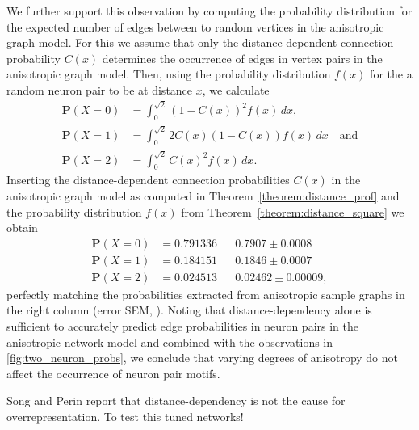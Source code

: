 We further support this observation by computing the probability
distribution for the expected number of edges between to random
vertices in the anisotropic graph model. For this we assume that only
the distance-dependent connection probability $C(x)$ determines the
occurrence of edges in vertex pairs in the anisotropic graph
model. Then, using the probability distribution $f(x)$ for the a
random neuron pair to be at distance $x$, we calculate
\begin{align*}
\mathbf{P}(X=0) & = \int_0^{\sqrt{2}} (1-C(x))^2 f(x)\,
dx, \\
\mathbf{P}(X=1) & = \int_0^{\sqrt{2}} 2 C(x) (1-C(x)) f(x) \, dx \quad \mathrm{and}\\
\mathbf{P}(X=2) & = \int_0^{\sqrt{2}} C(x)^2 f(x) \, dx. 
\end{align*}
Inserting the distance-dependent connection probabilities $C(x)$ in
the anisotropic graph model as computed in
Theorem~\ref{theorem:distance_prof} and the probability distribution
$f(x)$ from Theorem~\ref{theorem:distance_square} we obtain
\begin{align*} 
\mathbf{P}(X=0) & = 0.791336 && 0.7907  \pm 0.0008\\
\mathbf{P}(X=1) & = 0.184151 && 0.1846  \pm 0.0007\\
\mathbf{P}(X=2) & = 0.024513 && 0.02462  \pm 0.00009,
\end{align*}
perfectly matching the probabilities extracted from anisotropic sample
graphs in the right column (error SEM, ). Noting
that distance-dependency alone is sufficient to accurately predict
edge probabilities in neuron pairs in the anisotropic network model
and combined with the observations in \autoref{fig:two_neuron_probs},
we conclude that varying degrees of anisotropy do not affect the
occurrence of neuron pair motifs.






Song and Perin report that distance-dependency is not the cause for
overrepresentation. To test this tuned networks!



